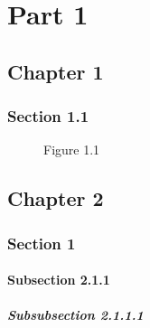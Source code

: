 \documentclass{book}
\begin{document}
\frontmatter


\mainmatter

\part{Part 1}
\label{part:part-1}



\chapter{Chapter 1}
\label{cha:chapter-1}

\clearpage{}

\section{Section 1.1}
\label{sec:section-1.1}


\begin{figure}
  \centering

  \caption{Figure 1.1}
  \label{fig:figure-1-1}
\end{figure}



\chapter{Chapter 2}
\label{cha:chapter-2}

\clearpage{}

\section{Section 1}
\label{sec:section-2.1}

\clearpage{}

\subsection{Subsection 2.1.1}
\label{sec:subsection-2.1.1}

\clearpage{}

\subsubsection{Subsubsection 2.1.1.1}
\label{sec:subs-2.1.1.1}
\end{document}
